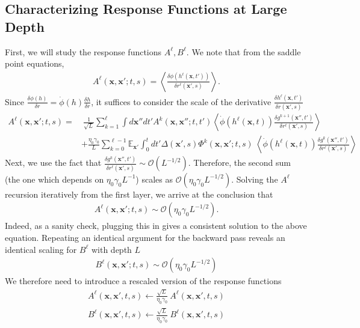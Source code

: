 \documentclass{article} %
\def\x{\bm x}
\begin{document}
\subsection{Characterizing Response Functions at Large Depth}\label{app:response_fn_negligible}

First, we will study the response functions $A^\ell, B^\ell$. We note that from the saddle point equations,
\begin{align}
    A^{\ell}(\x,\x';t,s) = \left< \frac{\delta \phi(h^\ell(\x,t'))}{\delta r^\ell(\x',s)} \right> .
\end{align}
Since $\frac{\delta \phi(h)}{\delta r} = \dot\phi(h) \frac{\delta h}{\delta r}$, it suffices to consider the scale of the derivative $\frac{\delta  h^\ell(\x,t')}{\delta r(\x',s)}$
\begin{align}
    A^\ell(\x,\x';t,s) =&  \ \frac{1}{\sqrt L} \sum_{k=1}^\ell \int d\x'' dt' A^{k}(\x,\x'';t,t') \left< \dot\phi(h^\ell(\x,t)) \frac{\delta g^{k+1}(\x'',t')}{\delta r^{\ell}(\x',s)} \right> \nonumber
    \\
    &+ \frac{\eta_0 \gamma_0}{L} \sum_{k=0}^{\ell-1} \mathbb{E}_{\x'} \int_0^t dt' \Delta(\x',s)  \Phi^{k}(\x,\x';t,s) \  \left< \dot\phi(h^\ell(\x,t)) \frac{\delta g^{k}(\x'',t')}{\delta r^{\ell}(\x',s)} \right>
\end{align}
Next, we use the fact that $\frac{\delta g^{k}(\x'',t')}{\delta r^{\ell}(\x',s)} \sim \mathcal{O}(L^{-1/2})$. Therefore, the second sum (the one which depends on $\eta_0 \gamma_0 L^{-1}$) scales as $\mathcal{O}(\eta_0 \gamma_0 L^{-1/2})$. Solving the $A^\ell$ recursion iteratively from the first layer, we arrive at the conclusion that
\begin{align}
    A^{\ell}(\x,\x';t,s) \sim \mathcal{O}(\eta_0 \gamma_0 L^{-1/2}) .
\end{align}
Indeed, as a sanity check, plugging this in gives a consistent solution to the above equation. Repeating an identical argument for the backward pass reveals an identical scaling for $B^\ell$ with depth $L$
\begin{align}
    B^\ell(\x,\x';t,s) \sim \mathcal{O}(\eta_0 \gamma_0 L^{-1/2}) 
\end{align}
We therefore need to introduce a rescaled version of the response functions
\begin{align}
    A^\ell(\x,\x',t,s) \leftarrow \frac{\sqrt L}{\eta_0 \gamma_0} \  A^\ell(\x,\x',t,s)
    \\
    {B}^\ell(\x,\x',t,s) \leftarrow  \frac{\sqrt L}{\eta_0 \gamma_0} \  B^\ell(\x,\x',t,s)
\end{align}
\end{document}
